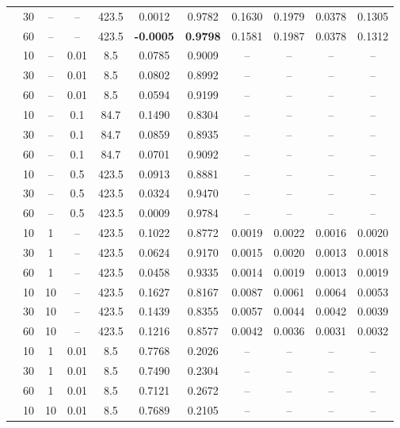 \begin{longtable}{@{}l c c c c c c c c c c@{}}
	& 30 & -- & -- & 423.5 & 0.0012 & 0.9782 & 0.1630 & 0.1979 & 0.0378 & 0.1305 \\
	& 60 & -- & -- & 423.5 & \textbf{-0.0005} & \textbf{0.9798} & 0.1581 & 0.1987 & 0.0378 & 0.1312 \\
	\arrayrulecolor{gray!60}\midrule\arrayrulecolor{black}
	\multirow{9}{*}{\textbf{TopK}} & 10 & -- & 0.01 & 8.5 & 0.0785 & 0.9009 & -- & -- & -- & -- \\
	& 30 & -- & 0.01 & 8.5 & 0.0802 & 0.8992 & -- & -- & -- & -- \\
	& 60 & -- & 0.01 & 8.5 & 0.0594 & 0.9199 & -- & -- & -- & -- \\
	& 10 & -- & 0.1 & 84.7 & 0.1490 & 0.8304 & -- & -- & -- & -- \\
	& 30 & -- & 0.1 & 84.7 & 0.0859 & 0.8935 & -- & -- & -- & -- \\
	& 60 & -- & 0.1 & 84.7 & 0.0701 & 0.9092 & -- & -- & -- & -- \\
	& 10 & -- & 0.5 & 423.5 & 0.0913 & 0.8881 & -- & -- & -- & -- \\
	& 30 & -- & 0.5 & 423.5 & 0.0324 & 0.9470 & -- & -- & -- & -- \\
	& 60 & -- & 0.5 & 423.5 & 0.0009 & 0.9784 & -- & -- & -- & -- \\
	\arrayrulecolor{gray!60}\midrule\arrayrulecolor{black}
	\multirow{6}{*}{\textbf{DP + FLTrust}} & 10 & 1 & -- & 423.5 & 0.1022 & 0.8772 & 0.0019 & 0.0022 & 0.0016 & 0.0020 \\
	& 30 & 1 & -- & 423.5 & 0.0624 & 0.9170 & 0.0015 & 0.0020 & 0.0013 & 0.0018 \\
	& 60 & 1 & -- & 423.5 & 0.0458 & 0.9335 & 0.0014 & 0.0019 & 0.0013 & 0.0019 \\
	& 10 & 10 & -- & 423.5 & 0.1627 & 0.8167 & 0.0087 & 0.0061 & 0.0064 & 0.0053 \\
	& 30 & 10 & -- & 423.5 & 0.1439 & 0.8355 & 0.0057 & 0.0044 & 0.0042 & 0.0039 \\
	& 60 & 10 & -- & 423.5 & 0.1216 & 0.8577 & 0.0042 & 0.0036 & 0.0031 & 0.0032 \\
	\arrayrulecolor{gray!60}\midrule\arrayrulecolor{black}
	\multirow{18}{*}{\textbf{DP + TopK}} & 10 & 1 & 0.01 & 8.5 & 0.7768 & 0.2026 & -- & -- & -- & -- \\
	& 30 & 1 & 0.01 & 8.5 & 0.7490 & 0.2304 & -- & -- & -- & -- \\
	& 60 & 1 & 0.01 & 8.5 & 0.7121 & 0.2672 & -- & -- & -- & -- \\
	& 10 & 10 & 0.01 & 8.5 & 0.7689 & 0.2105 & -- & -- & -- & -- \\

\end{longtable}
